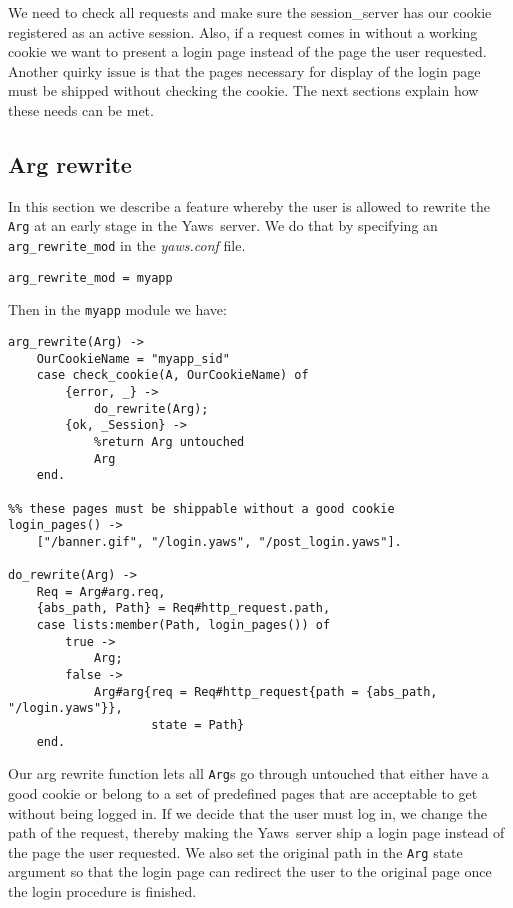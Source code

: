 \documentclass[11pt,oneside,english]{book}
\newcommand{\Yaws}            %
        {{\sc Yaws}}
\begin{document}
We need to check all requests and make sure the session\_server has
our cookie registered as an active session. Also, if a request comes
in without a working cookie we want to present a login page instead of
the page the user requested. Another quirky issue is that the pages
necessary for display of the login page must be shipped without
checking the cookie. The next sections explain how these needs can be
met.

\subsection{Arg rewrite}

In this section we describe a feature whereby the user is allowed to
rewrite the \verb+Arg+ at an early stage in the \Yaws\ server.  We do
that by specifying an \verb+arg_rewrite_mod+ in the \textit{yaws.conf}
file.

\begin{verbatim}
arg_rewrite_mod = myapp
\end{verbatim}


Then in the \verb+myapp+ module we have:

\begin{verbatim}
arg_rewrite(Arg) ->
    OurCookieName = "myapp_sid"
    case check_cookie(A, OurCookieName) of
        {error, _} ->
            do_rewrite(Arg);
        {ok, _Session} ->
            %return Arg untouched
            Arg
    end.

%% these pages must be shippable without a good cookie
login_pages() ->
    ["/banner.gif", "/login.yaws", "/post_login.yaws"].

do_rewrite(Arg) ->
    Req = Arg#arg.req,
    {abs_path, Path} = Req#http_request.path,
    case lists:member(Path, login_pages()) of
        true ->
            Arg;
        false ->
            Arg#arg{req = Req#http_request{path = {abs_path, "/login.yaws"}},
                    state = Path}
    end.

\end{verbatim}

Our arg rewrite function lets all \verb+Arg+s go through untouched
that either have a good cookie or belong to a set of predefined pages
that are acceptable to get without being logged in.  If we decide that
the user must log in, we change the path of the request, thereby
making the \Yaws\ server ship a login page instead of the page the
user requested. We also set the original path in the \verb+Arg+ state
argument so that the login page can redirect the user to the original
page once the login procedure is finished.
\end{document}
